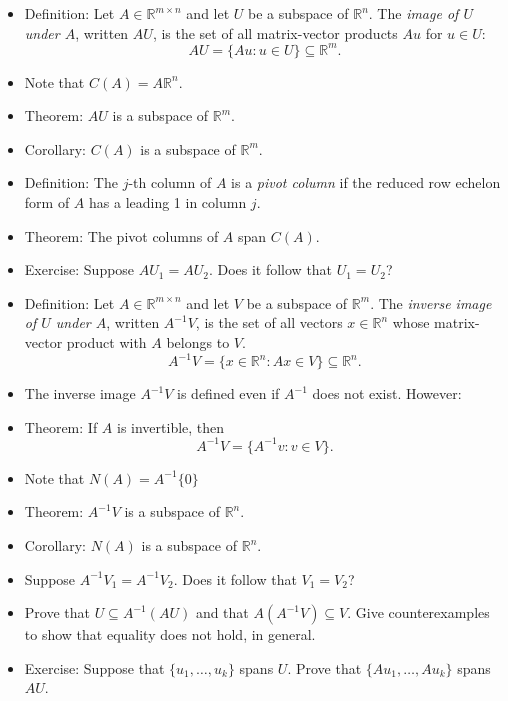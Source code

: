 \documentclass{amsart}
\newcommand{\RR}{\mathbb{R}}
\begin{document}
\begin{itemize}
\item Definition: Let $A\in\RR^{m\times n}$ and let $U$ be a subspace of $\RR^n$.
The \emph{image of $U$ under $A$}, written $AU$, is the set of all matrix-vector products $Au$ for $u\in U$:
$$
AU = \{Au : u\in U\}\subseteq \RR^m.
$$
\item Note that $C(A)=A\RR^n$.

\item Theorem: $AU$ is a subspace of $\RR^m$.

\item Corollary: $C(A)$ is a subspace of $\RR^m$.

\item Definition: The $j$-th column of $A$ is a \emph{pivot column} if the reduced row echelon form of $A$ has a leading 1 in column $j$.

\item Theorem: The pivot columns of $A$ span $C(A)$.

\item Exercise: Suppose $AU_1 = AU_2$. Does it follow that $U_1=U_2$?

\item Definition: Let $A\in\RR^{m\times n}$ and let $V$ be a subspace of $\RR^m$.
The \emph{inverse image of $U$ under $A$}, written $A^{-1}V$, is the set of all vectors $x\in\RR^n$ whose matrix-vector product with $A$ belongs to $V$.
$$
A^{-1}V = \{x\in\RR^n: Ax\in V\}\subseteq \RR^n.
$$
\item The inverse image $A^{-1}V$ is defined even if $A^{-1}$ does not exist. However:

\item Theorem: If $A$ is invertible, then
$$A^{-1}V = \{A^{-1}v : v\in V\}.$$

\item Note that $N(A) = A^{-1}\{0\}$

\item Theorem: $A^{-1}V$ is a subspace of $\RR^n$.

\item Corollary: $N(A)$ is a subspace of $\RR^n$.

\item Suppose $A^{-1}V_1 = A^{-1}V_2$. Does it follow that $V_1=V_2$?

\item Prove that $U\subseteq A^{-1}(AU)$ and that $A(A^{-1}V)\subseteq V$.
Give counterexamples to show that equality does not hold, in general.

\item Exercise: Suppose that $\{u_1,\ldots,u_k\}$ spans $U$. Prove that $\{Au_1,\ldots,Au_k\}$ spans $AU$.


\end{itemize}
\end{document}
